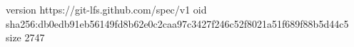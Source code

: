 version https://git-lfs.github.com/spec/v1
oid sha256:db0edb91eb56149fd8b62e0c2caa97c3427f246c52f8021a51f689f88b5d44c5
size 2747
